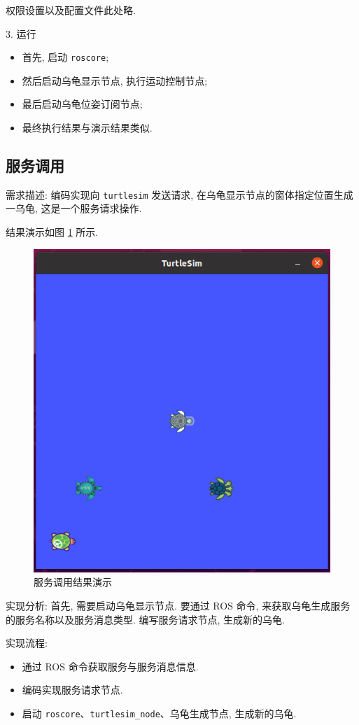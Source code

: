 \documentclass[openany, fontset=windowsold]{ctexbook}
\theoremstyle{kaiti}
\theoremstyle{normal}
\begin{document}
权限设置以及配置文件此处略.

3. 运行

\begin{itemize}
  \item 首先, 启动 \verb|roscore|;
  \item 然后启动乌龟显示节点, 执行运动控制节点; 
  \item 最后启动乌龟位姿订阅节点; 
  \item 最终执行结果与演示结果类似.
\end{itemize}

\subsection{服务调用}

需求描述: 编码实现向 \verb|turtlesim| 发送请求, 在乌龟显示节点的窗体指定位置生成一乌龟, 这是一个服务请求操作.

结果演示如图 \ref{fig:ros_demo_call_srv} 所示.

\begin{figure}[!ht]
  \centering
  \includegraphics[width=.5\textwidth]{ros_demo_call_srv.png}
  \caption{服务调用结果演示}
  \label{fig:ros_demo_call_srv}
\end{figure}

实现分析: 首先, 需要启动乌龟显示节点. 要通过 ROS 命令, 来获取乌龟生成服务的服务名称以及服务消息类型. 编写服务请求节点, 生成新的乌龟.

实现流程:

\begin{itemize}
  \item 通过 ROS 命令获取服务与服务消息信息.
  \item 编码实现服务请求节点.
  \item 启动 \verb|roscore|、\verb|turtlesim_node|、乌龟生成节点, 生成新的乌龟.
\end{itemize}
\end{document}
